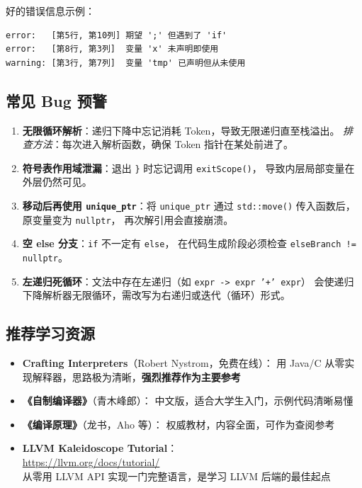 \documentclass[12pt, a4paper]{ctexart}
\begin{document}
好的错误信息示例：

\begin{lstlisting}[caption={错误信息格式参考}]
error:   [第5行, 第10列] 期望 ';' 但遇到了 'if'
error:   [第8行, 第3列]  变量 'x' 未声明即使用
warning: [第3行, 第7列]  变量 'tmp' 已声明但从未使用
\end{lstlisting}

\subsection{常见 Bug 预警}

\begin{warnbox}
\begin{enumerate}
  \item \textbf{无限循环解析}：递归下降中忘记消耗 Token，导致无限递归直至栈溢出。
        \textit{排查方法}：每次进入解析函数，确保 Token 指针在某处前进了。

  \item \textbf{符号表作用域泄漏}：退出 \texttt{\}} 时忘记调用 \texttt{exitScope()}，
        导致内层局部变量在外层仍然可见。

  \item \textbf{移动后再使用 \texttt{unique\_ptr}}：将 \texttt{unique\_ptr}
        通过 \texttt{std::move()} 传入函数后，原变量变为 \texttt{nullptr}，
        再次解引用会直接崩溃。

  \item \textbf{空 else 分支}：\texttt{if} 不一定有 \texttt{else}，
        在代码生成阶段必须检查 \texttt{elseBranch != nullptr}。

  \item \textbf{左递归死循环}：文法中存在左递归（如 \texttt{expr -> expr '+' expr}）
        会使递归下降解析器无限循环，需改写为右递归或迭代（循环）形式。
\end{enumerate}
\end{warnbox}

\subsection{推荐学习资源}

\begin{itemize}
  \item \textbf{Crafting Interpreters}（Robert Nystrom，免费在线）：
        用 Java/C 从零实现解释器，思路极为清晰，\textbf{强烈推荐作为主要参考}

  \item \textbf{《自制编译器》}（青木峰郎）：
        中文版，适合大学生入门，示例代码清晰易懂

  \item \textbf{《编译原理》}（龙书，Aho 等）：
        权威教材，内容全面，可作为查阅参考

  \item \textbf{LLVM Kaleidoscope Tutorial}：\\
        \href{https://llvm.org/docs/tutorial/}{https://llvm.org/docs/tutorial/}\\
        从零用 LLVM API 实现一门完整语言，是学习 LLVM 后端的最佳起点
\end{itemize}
\end{document}
